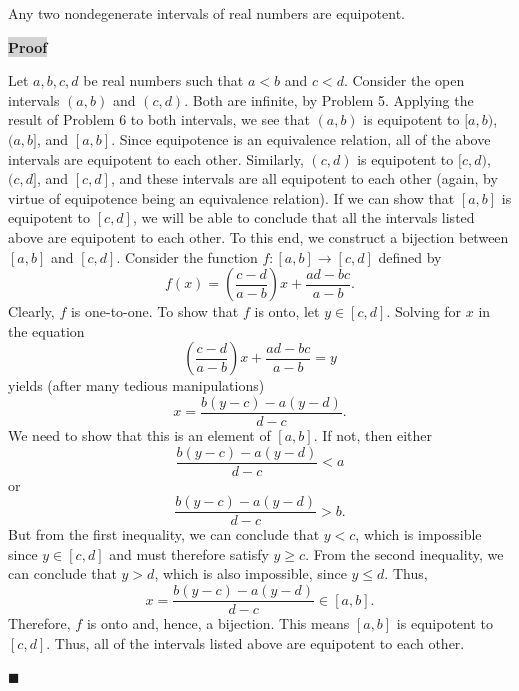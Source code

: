 \documentclass[12pt]{article}
\newcommand{\mybox}{%
    \collectbox{%
        \setlength{\fboxsep}{2pt}%
        \fbox{\BOXCONTENT}%
    }%
}
\begin{document}
\noindent Any two nondegenerate intervals of real numbers are equipotent.

\vspace{5mm}

\noindent\mybox{\colorbox{lightgray}{\textbf{Proof}}}\hspace{3mm}\hrulefill

\noindent Let $a,b,c,d$ be real numbers such that $a<b$ and $c<d$. Consider the open intervals $(a,b)$ and $(c,d)$. Both are infinite, by Problem 5. Applying the result of Problem 6 to both intervals, we see that $(a,b)$ is equipotent to $[a,b)$, $(a,b]$, and $[a,b]$. Since equipotence is an equivalence relation, all of the above intervals are equipotent to each other. Similarly, $(c,d)$ is equipotent to $[c,d)$, $(c,d]$, and $[c,d]$, and these intervals are all equipotent to each other (again, by virtue of equipotence being an equivalence relation). If we can show that $[a,b]$ is equipotent to $[c,d]$, we will be able to conclude that all the intervals listed above are equipotent to each other. To this end, we construct a bijection between $[a,b]$ and $[c,d]$. Consider the function $f:[a,b]\longrightarrow[c,d]$ defined by $$f(x) = \left(\frac{c-d}{a-b}\right)x+\frac{ad-bc}{a-b}.$$ Clearly, $f$ is one-to-one. To show that $f$ is onto, let $y\in[c,d]$. Solving for $x$ in the equation $$\left(\frac{c-d}{a-b}\right)x+\frac{ad-bc}{a-b} = y$$ yields (after many tedious manipulations) $$x=\frac{b(y-c)-a(y-d)}{d-c}.$$ We need to show that this is an element of $[a,b].$ If not, then either $$\frac{b(y-c)-a(y-d)}{d-c} < a$$ or $$\frac{b(y-c)-a(y-d)}{d-c} > b.$$ But from the first inequality, we can conclude that $y<c$, which is impossible since $y\in[c,d]$ and must therefore satisfy $y\geq c$. From the second inequality, we can conclude that $y>d$, which is also impossible, since $y\leq d$. Thus, $$x=\frac{b(y-c)-a(y-d)}{d-c}\in[a,b].$$ Therefore, $f$ is onto and, hence, a bijection. This means $[a,b]$ is equipotent to $[c,d]$. Thus, all of the intervals listed above are equipotent to each other. 

\hfill$\blacksquare$
\end{document}

